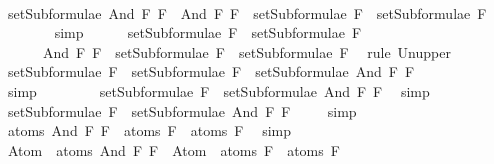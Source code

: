 \begin{isabellebody}
\ \ \ \ \isamarkupfalse%
\ {\isachardoublequoteopen}setSubformulae\ {\isacharparenleft}And\ F{}\ F{}{\isacharparenright}\ {\isacharequal}\ {\isacharbraceleft}And\ F{}\ F{}{\isacharbraceright}\ {\isasymunion}\ {\isacharparenleft}setSubformulae\ F{}\ {\isasymunion}\ setSubformulae\ F{}{\isacharparenright}{\isachardoublequoteclose}\ \isanewline
\ \ \ \ \ \ \isamarkupfalse%
\ simp\isanewline
\ \ \ \ \isamarkupfalse%
\ {\isachardoublequoteopen}setSubformulae\ F{}\ {\isasymunion}\ setSubformulae\ F{}\ {\isasymsubseteq}\ \isanewline
\ \ \ \ \ \ {\isacharbraceleft}And\ F{}\ F{}{\isacharbraceright}\ {\isasymunion}\ {\isacharparenleft}setSubformulae\ F{}\ {\isasymunion}\ setSubformulae\ F{}{\isacharparenright}{\isachardoublequoteclose}\ \isamarkupfalse%
\ {\isacharparenleft}rule\ Un{\isacharunderscore}upper{}{\isacharparenright}\isanewline
\ \ \ \ \isamarkupfalse%
\ \isamarkupfalse%
\ {}{\isacharcolon}{\isachardoublequoteopen}setSubformulae\ F{}\ {\isasymunion}\ setSubformulae\ F{}\ {\isasymsubseteq}\ setSubformulae\ {\isacharparenleft}And\ F{}\ F{}{\isacharparenright}{\isachardoublequoteclose}\isanewline
\ \ \ \ \ \ \isamarkupfalse%
\ simp\ \isanewline
\ \ \ \ \isamarkupfalse%
\ \isamarkupfalse%
\ {\isachardoublequoteopen}setSubformulae\ F{}\ {\isasymsubseteq}\ setSubformulae\ {\isacharparenleft}And\ F{}\ F{}{\isacharparenright}{\isachardoublequoteclose}\ \isamarkupfalse%
\ simp\isanewline
\ \ \ \ \isamarkupfalse%
\ {\isachardoublequoteopen}setSubformulae\ F{}\ {\isasymsubseteq}\ setSubformulae\ {\isacharparenleft}And\ F{}\ F{}{\isacharparenright}{\isachardoublequoteclose}\ \isamarkupfalse%
\ {}\ \isamarkupfalse%
\ simp\isanewline
\ \ \ \ \isamarkupfalse%
\ \isamarkupfalse%
\ {\isachardoublequoteopen}atoms\ {\isacharparenleft}And\ F{}\ F{}{\isacharparenright}\ {\isacharequal}\ atoms\ F{}\ {\isasymunion}\ atoms\ F{}{\isachardoublequoteclose}\ \isamarkupfalse%
\ simp\isanewline
\ \ \ \ \isamarkupfalse%
\ \isamarkupfalse%
\ {\isachardoublequoteopen}Atom\ {\isacharbackquote}\ atoms\ {\isacharparenleft}And\ F{}\ F{}{\isacharparenright}\ {\isacharequal}\ Atom\ {\isacharbackquote}\ {\isacharparenleft}atoms\ F{}\ {\isasymunion}\ atoms\ F{}{\isacharparenright}{\isachardoublequoteclose}\ \isamarkupfalse%

\end{isabellebody}
